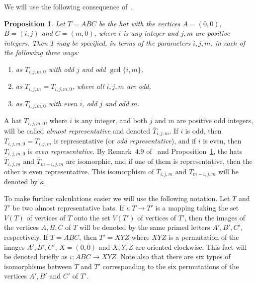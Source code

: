 \documentclass[12pt]{amsart}
\newcommand{\ovT}{\overline{T}}
\theoremstyle{plain}
\newtheorem{proposition}[theorem]{Proposition}
\theoremstyle{definition}
\numberwithin{equation}{section}
\begin{document}
We will use the following consequence of~\cite[Rem.~4.10, Prop.~4.11, Rem.~4.12]{MR25}.



\begin{proposition}\label{P:equivrepr}
Let $T = ABC$ be the hat with the vertices $A = (0,0)$, $B = (i,j)$ and $C = (m,0)$, where $i$ is any integer and $j, m$ are positive integers.
 Then $T$ may be specified, in terms of the parameters $i,j,m$, in each of the following three
ways:
\begin{enumerate}
\item[(a)] as $T_{i,j,m,0}$ with odd $j$ and odd $\gcd\{i,m\}$,
\item[(b)] as $T_{i,j,m} = T_{i,j,m,0}$, where all $i, j, m$ are odd,
\item[(c)] as $T_{i,j,m,0}$ with even $i$, odd $j$ and odd $m$.
\end{enumerate}

\end{proposition}


A hat $T_{i,j,m,0}$, where $i$ is any integer, and both $j$ and $m$ are positive odd integers,
will be called \emph{almost representative} and denoted $\ovT_{i,j,m}$. If $i$ is odd, then
$T_{i,j,m,0} = T_{i,j,m}$ is representative (or \emph{odd representative}), and if $i$ is even, then $T_{i,j,m,0}$ is \emph{even representative}. By Remark~$4.9$ of~\cite{MR25}
and Proposition~\ref{P:equivrepr}, the hats $\ovT_{i,j,m}$ and $\ovT_{m-i,j,m}$ are isomorphic, and if one of them is representative, then the other is even representative. This isomorphism of $\ovT_{i,j,m}$ and $\ovT_{m-i,j,m}$ will be denoted by $\kappa$.


To make further calculations easier we will use the following notation. Let $T$ and $T'$ be two almost representative hats. If $\iota: T \rightarrow T'$ is a mapping taking the set $V(T)$ of vertices of $T$ onto the set $V(T')$ of vertices of $T'$, then the images of the vertices $A, B, C$ of $T$ will be denoted by the same primed letters $A', B', C'$, respectively. If $T = ABC$,
then $T' = XYZ$ where $XYZ$ is a permutation of the images $A', B', C'$, $X = (0,0)$ and $X, Y, Z$ are oriented clockwise. This fact will be denoted briefly as $\iota: ABC \rightarrow XYZ$. Note also that there are six types of isomorphisms between $T$ and $T'$ corresponding to the six permutations of the vertices $A', B'$ and $C'$ of $T'$.
\end{document}

